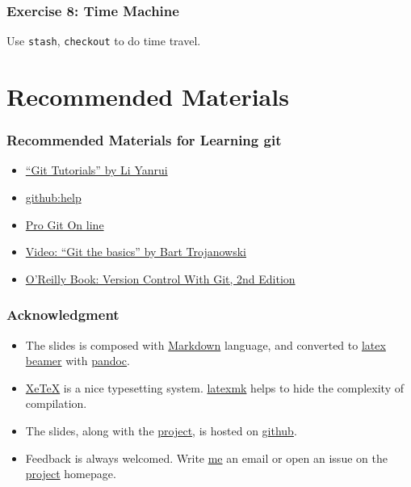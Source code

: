 \documentclass[11pt,ignorenonframetext,]{beamer}
\begin{document}
\begin{frame}[fragile]\frametitle{Exercise 8: Time Machine}

Use \texttt{stash}, \texttt{checkout} to do time travel.

\end{frame}

\section{Recommended Materials}

\begin{frame}\frametitle{Recommended Materials for Learning git}

\begin{itemize}
\item
  \href{http://goo.gl/NBGgo}{``Git Tutorials'' by Li Yanrui}
\item
  \href{http://help.github.com/}{github:help}
\item
  \href{http://progit.org/book/}{Pro Git On line}
\item
  \href{http://excess.org/article/2008/07/ogre-git-tutorial/}{Video:
  ``Git the basics'' by Bart Trojanowski}
\item
  \href{http://shop.oreilly.com/product/0636920022862.do}{O'Reilly Book:
  Version Control With Git, 2nd Edition}
\end{itemize}
\end{frame}

\begin{frame}\frametitle{Acknowledgment}

\begin{itemize}
\item
  The slides is composed with
  \href{http://daringfireball.net/projects/markdown/}{Markdown}
  language, and converted to
  \href{https://bitbucket.org/rivanvx/beamer/wiki/Home}{latex beamer}
  with \href{http://johnmacfarlane.net/pandoc/}{pandoc}.\\
\item
  \href{http://www.tug.org/xetex/}{XeTeX} is a nice typesetting system.
  \href{http://www.phys.psu.edu/~collins/software/latexmk-jcc/}{latexmk}
  helps to hide the complexity of compilation.
\item
  The slides, along with the
  \href{https://github.com/weijianwen/GitForBeginners}{project}, is
  hosted on \href{https://github.com/}{github}.
\item
  Feedback is always welcomed. Write
  \href{mailto:weijianwen@sjtu.edu.cn}{me} an email or open an issue on the
  \href{https://github.com/weijianwen/GitForBeginners}{project}
  homepage.

\end{itemize}
\end{frame}
\end{document}
